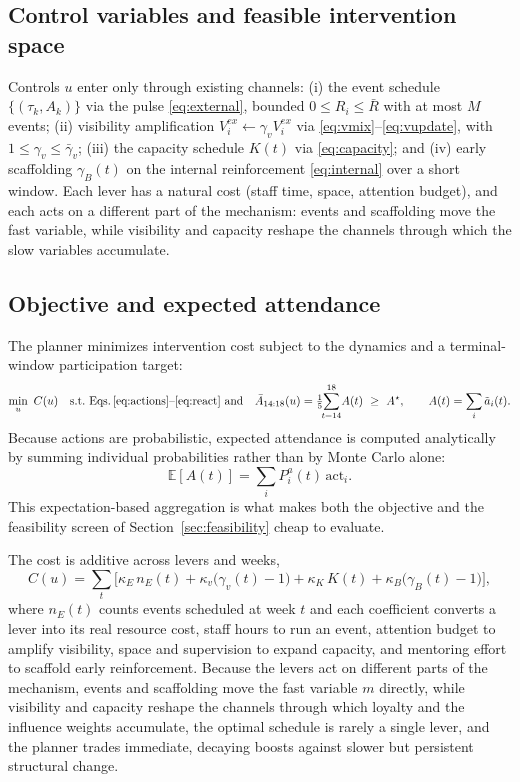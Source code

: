 \documentclass[11pt]{article}
\begin{document}
\subsection{Control variables and feasible intervention space}
Controls $u$ enter only through existing channels: (i) the event schedule $\{(\tau_k,A_k)\}$ via the pulse \eqref{eq:external}, bounded $0\le R_i\le\bar R$ with at most $M$ events; (ii) visibility amplification $V^{ex}_i\leftarrow\gamma_v V^{ex}_i$ via \eqref{eq:vmix}--\eqref{eq:vupdate}, with $1\le\gamma_v\le\bar\gamma_v$; (iii) the capacity schedule $K(t)$ via \eqref{eq:capacity}; and (iv) early scaffolding $\gamma_B(t)$ on the internal reinforcement \eqref{eq:internal} over a short window. Each lever has a natural cost (staff time, space, attention budget), and each acts on a different part of the mechanism: events and scaffolding move the fast variable, while visibility and capacity reshape the channels through which the slow variables accumulate.

\subsection{Objective and expected attendance}
The planner minimizes intervention cost subject to the dynamics and a terminal-window participation target:
\begin{equation*}
\min_{u}\ C(u)\quad\text{s.t.\ Eqs.\,\eqref{eq:actions}--\eqref{eq:react} and}\quad
\bar A_{14:18}(u)=\tfrac15\!\!\sum_{t=14}^{18}\!A(t)\ \ge\ A^\star,\qquad A(t)=\sum_i\tilde a_i(t).
\end{equation*}
Because actions are probabilistic, expected attendance is computed analytically by summing individual probabilities rather than by Monte Carlo alone:
\begin{equation*}
\mathbb{E}[A(t)]=\sum_i P^a_i(t)\,\mathrm{act}_i.
\end{equation*}
This expectation-based aggregation is what makes both the objective and the feasibility screen of Section~\ref{sec:feasibility} cheap to evaluate.

The cost is additive across levers and weeks,
\begin{equation*}
C(u)=\sum_t\Big[\kappa_E\,n_E(t)+\kappa_v\big(\gamma_v(t)-1\big)+\kappa_K\,K(t)+\kappa_B\big(\gamma_B(t)-1\big)\Big],
\end{equation*}
where $n_E(t)$ counts events scheduled at week $t$ and each coefficient converts a lever into its real resource cost, staff hours to run an event, attention budget to amplify visibility, space and supervision to expand capacity, and mentoring effort to scaffold early reinforcement. Because the levers act on different parts of the mechanism, events and scaffolding move the fast variable $m$ directly, while visibility and capacity reshape the channels through which loyalty and the influence weights accumulate, the optimal schedule is rarely a single lever, and the planner trades immediate, decaying boosts against slower but persistent structural change.
\end{document}
